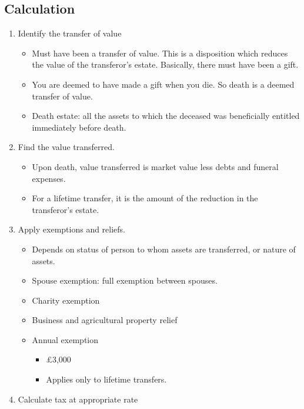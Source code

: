 \documentclass[
]{article}
\providecommand{\tightlist}{%
  \setlength{\itemsep}{0pt}\setlength{\parskip}{0pt}}
\begin{document}
\hypertarget{calculation}{%
\subsection{Calculation}\label{calculation}}

\begin{enumerate}
\def\labelenumi{\arabic{enumi}.}
\tightlist
\item
  Identify the transfer of value

  \begin{itemize}
  \tightlist
  \item
    Must have been a transfer of value. This is a disposition which
    reduces the value of the transferor's estate. Basically, there must
    have been a gift.
  \item
    You are deemed to have made a gift when you die. So death is a
    deemed transfer of value.
  \item
    Death estate: all the assets to which the deceased was beneficially
    entitled immediately before death.
  \end{itemize}
\item
  Find the value transferred.

  \begin{itemize}
  \tightlist
  \item
    Upon death, value transferred is market value less debts and funeral
    expenses.
  \item
    For a lifetime transfer, it is the amount of the reduction in the
    transferor's estate.
  \end{itemize}
\item
  Apply exemptions and reliefs.

  \begin{itemize}
  \tightlist
  \item
    Depends on status of person to whom assets are transferred, or
    nature of assets.
  \item
    Spouse exemption: full exemption between spouses.
  \item
    Charity exemption
  \item
    Business and agricultural property relief
  \item
    Annual exemption

    \begin{itemize}
    \tightlist
    \item
      £3,000
    \item
      Applies only to lifetime transfers.
    \end{itemize}
  \end{itemize}
\item
  Calculate tax at appropriate rate


\end{enumerate}
\end{document}
